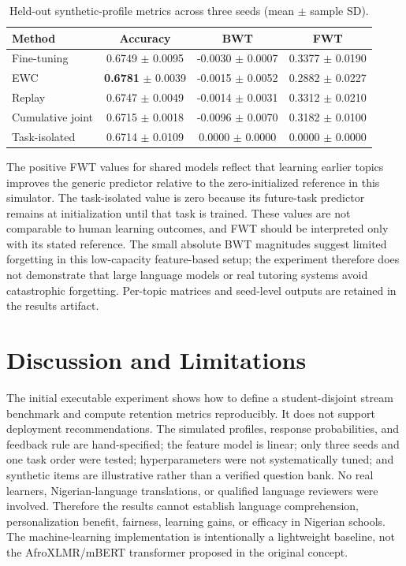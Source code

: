 \documentclass[conference]{IEEEtran}
\begin{document}
\begin{table}[t]
\centering
\caption{Held-out synthetic-profile metrics across three seeds (mean $\pm$ sample SD).}
\label{tab:results}
\small
\begin{tabular}{lccc}
\toprule
Method & Accuracy & BWT & FWT \\
\midrule
Fine-tuning & 0.6749 $\pm$ 0.0095 & -0.0030 $\pm$ 0.0007 & 0.3377 $\pm$ 0.0190 \\
EWC & \textbf{0.6781} $\pm$ 0.0039 & -0.0015 $\pm$ 0.0052 & 0.2882 $\pm$ 0.0227 \\
Replay & 0.6747 $\pm$ 0.0049 & -0.0014 $\pm$ 0.0031 & 0.3312 $\pm$ 0.0210 \\
Cumulative joint & 0.6715 $\pm$ 0.0018 & -0.0096 $\pm$ 0.0070 & 0.3182 $\pm$ 0.0100 \\
Task-isolated & 0.6714 $\pm$ 0.0109 & 0.0000 $\pm$ 0.0000 & 0.0000 $\pm$ 0.0000 \\
\bottomrule
\end{tabular}
\end{table}

The positive FWT values for shared models reflect that learning earlier topics improves the generic predictor relative to the zero-initialized reference in this simulator. The task-isolated value is zero because its future-task predictor remains at initialization until that task is trained. These values are not comparable to human learning outcomes, and FWT should be interpreted only with its stated reference. The small absolute BWT magnitudes suggest limited forgetting in this low-capacity feature-based setup; the experiment therefore does not demonstrate that large language models or real tutoring systems avoid catastrophic forgetting. Per-topic matrices and seed-level outputs are retained in the results artifact.
\section{Discussion and Limitations}
The initial executable experiment shows how to define a student-disjoint stream benchmark and compute retention metrics reproducibly. It does not support deployment recommendations. The simulated profiles, response probabilities, and feedback rule are hand-specified; the feature model is linear; only three seeds and one task order were tested; hyperparameters were not systematically tuned; and synthetic items are illustrative rather than a verified question bank. No real learners, Nigerian-language translations, or qualified language reviewers were involved. Therefore the results cannot establish language comprehension, personalization benefit, fairness, learning gains, or efficacy in Nigerian schools. The machine-learning implementation is intentionally a lightweight baseline, not the AfroXLMR/mBERT transformer proposed in the original concept.
\end{document}
